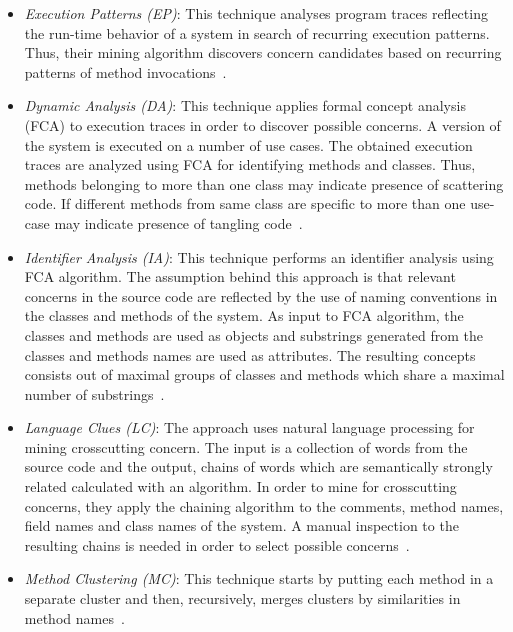 \begin{itemize}

\item \textit{Execution Patterns (EP)}: This technique analyses program traces reflecting the run-time behavior of a system in search of recurring execution patterns. Thus, their mining algorithm discovers concern candidates based on recurring patterns of method invocations~\cite{Breu:2004:AMU:1025115.1025235}.

\item \textit{Dynamic Analysis (DA)}: This technique applies formal concept analysis (FCA) to execution traces in order to discover possible concerns. A version of the system is executed on a number of use cases. The obtained execution traces are analyzed using FCA for identifying methods and classes. Thus, methods belonging to more than one class may indicate presence of scattering code. If
different methods from same class are specific to more than one use-case may indicate presence of tangling code~\cite{Ceccato:2008:ASM:1545010.1545380}.

\item \textit{Identifier Analysis (IA)}: This technique performs an identifier analysis using FCA algorithm. The assumption behind this approach is that relevant concerns in the source code are reflected by the use of naming conventions in the classes and methods of the system. As input to FCA algorithm, the classes and methods are used as objects and substrings generated from the classes and methods names are used as attributes. The resulting concepts consists out of maximal groups of classes and methods which share a maximal number of substrings~\cite{Tourwe:2004:MAV:1018444.1022149}.

\item \textit{Language Clues (LC)}: The approach uses natural language processing for mining crosscutting concern. The input is a collection of words from the source code and the output, chains of words which are semantically strongly related calculated with an algorithm. In order to mine for crosscutting concerns, they apply the chaining algorithm to the comments, method names, field names and class names of the system. A manual inspection to the resulting chains is needed in order to select possible concerns~\cite{Shepherd:2005:ULC:1083125.1083129}.

\item \textit{Method Clustering (MC)}: This technique starts by putting each method in a separate cluster and then, recursively, merges clusters by similarities in method names~\cite{Bernardi2009CTI}. 


\end{itemize}
